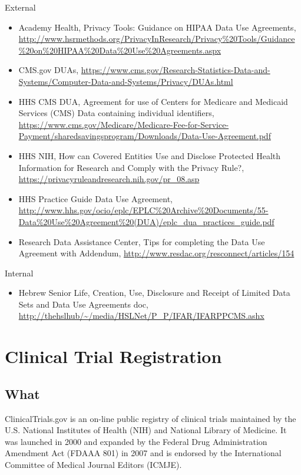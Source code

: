 \documentclass[]{book}
\providecommand{\tightlist}{%
  \setlength{\itemsep}{0pt}\setlength{\parskip}{0pt}}
\theoremstyle{definition}
\theoremstyle{definition}
\theoremstyle{definition}
\theoremstyle{remark}
\begin{document}
External

\begin{itemize}
\tightlist
\item
  Academy Health, Privacy Tools: Guidance on HIPAA Data Use Agreements,
  \url{http://www.hsrmethods.org/PrivacyInResearch/Privacy\%20Tools/Guidance\%20on\%20HIPAA\%20Data\%20Use\%20Agreements.aspx}
\item
  CMS.gov DUAs,
  \url{https://www.cms.gov/Research-Statistics-Data-and-Systems/Computer-Data-and-Systems/Privacy/DUAs.html}
\item
  HHS CMS DUA, Agreement for use of Centers for Medicare and Medicaid
  Services (CMS) Data containing individual identifiers,
  \url{https://www.cms.gov/Medicare/Medicare-Fee-for-Service-Payment/sharedsavingsprogram/Downloads/Data-Use-Agreement.pdf}
\item
  HHS NIH, How can Covered Entities Use and Disclose Protected Health
  Information for Research and Comply with the Privacy Rule?,
  \url{https://privacyruleandresearch.nih.gov/pr_08.asp}
\item
  HHS Practice Guide Data Use Agreement,
  \url{http://www.hhs.gov/ocio/eplc/EPLC\%20Archive\%20Documents/55-Data\%20Use\%20Agreement\%20(DUA)/eplc_dua_practices_guide.pdf}
\item
  Research Data Assistance Center, Tips for completing the Data Use
  Agreement with Addendum,
  \url{http://www.resdac.org/resconnect/articles/154}
\end{itemize}

Internal

\begin{itemize}
\tightlist
\item
  Hebrew Senior Life, Creation, Use, Disclosure and Receipt of Limited
  Data Sets and Data Use Agreements doc,
  \url{http://thehslhub/~/media/HSLNet/P_P/IFAR/IFARPPCMS.ashx}
\end{itemize}

\section{Clinical Trial Registration}\label{clinical-trial-registration}

\subsection{What}\label{what-8}

ClinicalTrials.gov is an on-line public registry of clinical trials
maintained by the U.S. National Institutes of Health (NIH) and National
Library of Medicine. It was launched in 2000 and expanded by the Federal
Drug Administration Amendment Act (FDAAA 801) in 2007 and is endorsed by
the International Committee of Medical Journal Editors (ICMJE).
\end{document}
